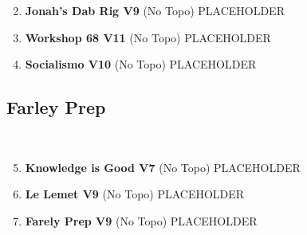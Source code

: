\begin{enumerate}[]
	\setcounter{enumi}{1}
	\item\label{rt:Jonah's Dab Rig} \colorbox{Goldenrod!50}{\textbf{Jonah's Dab Rig V9  } }
	\newline (No Topo) 
	\newline PLACEHOLDER\
	\setcounter{enumi}{2}
	\item\label{rt:Workshop 68} \colorbox{red!20}{\textbf{Workshop 68 V11  } }
	\newline (No Topo) 
	\newline PLACEHOLDER\
	\setcounter{enumi}{3}
	\item\label{rt:Socialismo} \colorbox{red!20}{\textbf{Socialismo V10  } }
	\newline (No Topo) 
	\newline PLACEHOLDER\
\end{enumerate}
\subsection*{Farley Prep}\label{bf:Farley Prep}
\

\begin{enumerate}[]
	\setcounter{enumi}{4}
	\item\label{rt:Knowledge is Good} \colorbox{Goldenrod!50}{\textbf{Knowledge is Good V7  } }
	\newline (No Topo) 
	\newline PLACEHOLDER\
	\setcounter{enumi}{5}
	\item\label{rt:Le Lemet} \colorbox{Goldenrod!50}{\textbf{Le Lemet V9  } }
	\newline (No Topo) 
	\newline PLACEHOLDER\
	\setcounter{enumi}{6}
	\item\label{rt:Farely Prep} \colorbox{Goldenrod!50}{\textbf{Farely Prep V9  } }
	\newline (No Topo) 
	\newline PLACEHOLDER\
\end{enumerate}
\clearpage
